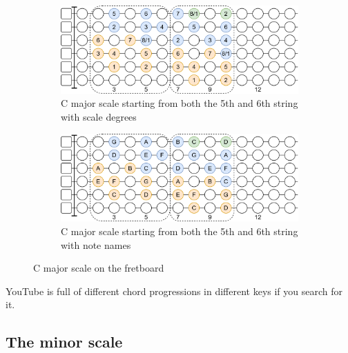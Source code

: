 \begin{figure}[h]
	\begin{subfigure}[b]{\textwidth}
		\centering
		\includegraphics[height=0.19\textheight]{../../Images/guitar_c_major_scales_from_5_6_string_fretboard.png}
		\caption{C major scale starting from both the 5th and 6th string with scale degrees}
	\label{fig:guitar_c_major_scales_from_5_6_string_fretboard}
	\end{subfigure}
	
	\vspace{0.5cm}
	
	\begin{subfigure}[b]{\textwidth}
		\centering
		\includegraphics[height=0.19\textheight]{../../Images/guitar_c_major_scales_from_5_6_string_fretboard_note_names.png}
		\caption{C major scale starting from both the 5th and 6th string with note names}
		\label{fig:guitar_c_major_scales_from_5_6_string_fretboard_note_names}
	\end{subfigure}
	
	\caption{C major scale on the fretboard}
\end{figure}

YouTube is full of different chord progressions in different keys if you search for it.

\newpage

\subsection{The minor scale}

